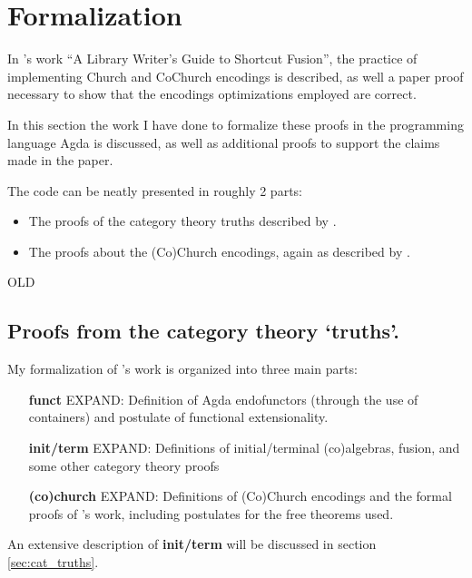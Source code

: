 \section{Formalization}
In \cite{Harper2011}'s work ``A Library Writer's Guide to Shortcut Fusion'', the practice of implementing Church and CoChurch encodings is described, as well a paper proof necessary to show that the encodings optimizations employed are correct.

In this section the work I have done to formalize these proofs in the programming language Agda is discussed, as well as additional proofs to support the claims made in the paper.

The code can be neatly presented in roughly 2 parts:
\begin{itemize}
  \item The proofs of the category theory truths described by \cite{Harper2011}.
  \item The proofs about the (Co)Church encodings, again as described by \cite{Harper2011}.
\end{itemize}




\iffalse
OLD
\subsection{Proofs from the category theory `truths'.}
My formalization of \cite{Harper2011}'s work is organized into three main parts:
\begin{itemize}
    \item[\textbf{funct}] EXPAND: Definition of Agda endofunctors (through the use of containers) and postulate of functional extensionality.
    \item[\textbf{init/term}] EXPAND: Definitions of initial/terminal (co)algebras, fusion, and some other category theory proofs
    \item[\textbf{(co)church}] EXPAND: Definitions of (Co)Church encodings and the formal proofs of \cite{Harper2011}'s work, including postulates for the free theorems used.
\end{itemize}
An extensive description of \textbf{init/term} will be discussed in section \ref{sec:cat_truths}.

